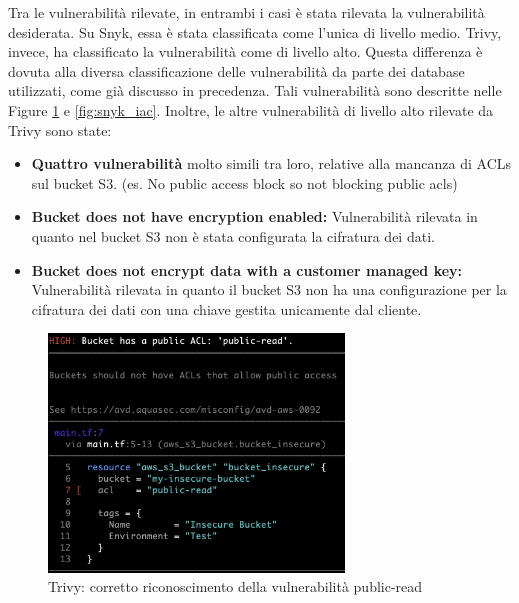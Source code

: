 Tra le vulnerabilità rilevate, in entrambi i casi è stata rilevata la vulnerabilità desiderata. Su Snyk, essa è stata classificata come l'unica di livello medio. Trivy, invece, ha classificato la vulnerabilità come di livello alto. Questa differenza è dovuta alla diversa classificazione delle vulnerabilità da parte dei database utilizzati, come già discusso in precedenza. Tali vulnerabilità sono descritte nelle Figure \ref{fig:trivy_iac} e \ref{fig:snyk_iac}.
Inoltre, le altre vulnerabilità di livello alto rilevate da Trivy sono state:
\begin{itemize}
   \item \textbf{Quattro vulnerabilità} molto simili tra loro, relative alla mancanza di ACLs sul bucket S3. (es. No public access block so not blocking public acls)
   \item \textbf{Bucket does not have encryption enabled:} Vulnerabilità rilevata in quanto nel bucket S3 non è stata configurata la cifratura dei dati.
   \item \textbf{Bucket does not encrypt data with a customer managed key:} Vulnerabilità rilevata in quanto il bucket S3 non ha una configurazione per la cifratura dei dati con una chiave gestita unicamente dal cliente.

\end{itemize}

\begin{figure}[H]
   \centering
   \includegraphics[width=0.7\textwidth]{immagini/capitolo2/trivy_iac.png}
   \caption{Trivy: corretto riconoscimento della vulnerabilità public-read}
   \label{fig:trivy_iac}
\end{figure}

